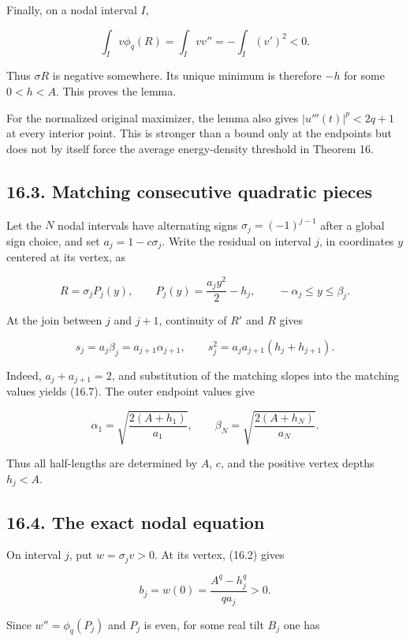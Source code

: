 \documentclass[11pt]{article}
\begin{document}
Finally, on a nodal interval \(I\),

\[
\int_I v\phi_q(R)=\int_I vv''=-\int_I(v')^2<0.
\]

Thus \(\sigma R\) is negative somewhere. Its unique minimum is therefore
\(-h\) for some \(0<h<A\). This proves the lemma.

For the normalized original maximizer, the lemma also gives
\(|u'''(t)|^p<2q+1\) at every interior point. This is stronger than a
bound only at the endpoints but does not by itself force the average
energy-density threshold in Theorem 16.

\subsection{16.3. Matching consecutive quadratic
pieces}\label{matching-consecutive-quadratic-pieces}

Let the \(N\) nodal intervals have alternating signs
\(\sigma_j=(-1)^{j-1}\) after a global sign choice, and set
\(a_j=1-c\sigma_j\). Write the residual on interval \(j\), in
coordinates \(y\) centered at its vertex, as

\[
R=\sigma_j P_j(y),\qquad P_j(y)=\frac{a_jy^2}{2}-h_j,
\qquad -\alpha_j\le y\le\beta_j.
\tag{16.6}
\]

At the join between \(j\) and \(j+1\), continuity of \(R'\) and \(R\)
gives

\[
s_j=a_j\beta_j=a_{j+1}\alpha_{j+1},
\qquad s_j^2=a_ja_{j+1}(h_j+h_{j+1}).
\tag{16.7}
\]

Indeed, \(a_j+a_{j+1}=2\), and substitution of the matching slopes into
the matching values yields (16.7). The outer endpoint values give

\[
\alpha_1=\sqrt{\frac{2(A+h_1)}{a_1}},\qquad
\beta_N=\sqrt{\frac{2(A+h_N)}{a_N}}.
\tag{16.8}
\]

Thus all half-lengths are determined by \(A\), \(c\), and the positive
vertex depths \(h_j<A\).

\subsection{16.4. The exact nodal
equation}\label{the-exact-nodal-equation}

On interval \(j\), put \(w=\sigma_jv>0\). At its vertex, (16.2) gives

\[
b_j=w(0)=\frac{A^q-h_j^q}{q a_j}>0.
\]

Since \(w''=\phi_q(P_j)\) and \(P_j\) is even, for some real tilt
\(B_j\) one has
\end{document}
